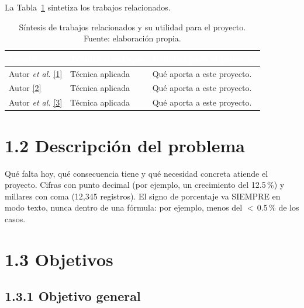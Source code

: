 \documentclass[12pt,letterpaper]{report}
\newcommand{\cita}[1]{\hyperref[bib:#1]{[#1]}}
\begin{document}
La Tabla~\ref{tab:antecedentes} sintetiza los trabajos relacionados.

\begin{table}[H]
    \centering
    \footnotesize
    \setlength{\arrayrulewidth}{0.7pt}
    \setlength{\tabcolsep}{4pt}
    \begin{tabular}{>{\raggedright\arraybackslash}p{3.0cm}
                    >{\raggedright\arraybackslash}p{4.2cm}
                    >{\raggedright\arraybackslash}p{5.6cm}}
        \hline
        \rowcolor{colorprimario!90}
        \textcolor{white}{\textbf{Fuente}} &
        \textcolor{white}{\textbf{Técnica o enfoque}} &
        \textcolor{white}{\textbf{Utilidad para el proyecto}} \\
        \hline
        \rowcolor{colorprimario!8}
        Autor \textit{et al.} \cita{1} & Técnica aplicada & Qué aporta a este proyecto. \\
        Autor \cita{2} & Técnica aplicada & Qué aporta a este proyecto. \\
        \rowcolor{colorprimario!8}
        Autor \textit{et al.} \cita{3} & Técnica aplicada & Qué aporta a este proyecto. \\
        \hline
    \end{tabular}
    \caption[Trabajos relacionados.]{Síntesis de trabajos relacionados y su utilidad para el proyecto. Fuente: elaboración propia.}
    \label{tab:antecedentes}
\end{table}

\section{1.2 Descripción del problema}

Qué falta hoy, qué consecuencia tiene y qué necesidad concreta atiende el proyecto. Cifras con punto decimal (por ejemplo, un crecimiento del 12.5\,\%) y millares con coma (12,345 registros). El signo de porcentaje va SIEMPRE en modo texto, nunca dentro de una fórmula: por ejemplo, menos del $<$\,0.5\,\% de los casos.

\section{1.3 Objetivos}

\subsection{1.3.1 Objetivo general}
\end{document}

